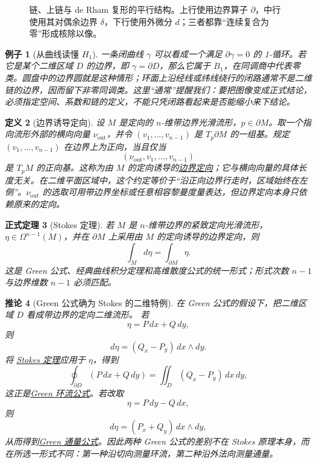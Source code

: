 \documentclass[UTF8,fontset=none,a4paper,11pt]{ctexart}
\theoremstyle{foundation-definition}
\newtheorem{definition}{定义}[section]
\theoremstyle{foundation-theorem}
\newtheorem{theorem}[definition]{正式定理}
\theoremstyle{foundation-proposition}
\theoremstyle{foundation-example}
\newtheorem{example}[definition]{例子}
\theoremstyle{foundation-remark}
\theoremstyle{foundation-theorem}
\newtheorem{corollary}[definition]{推论}
\newcommand{\term}[2]{\hyperref[#1]{#2}}
\begin{document}
\begin{figure}[htbp]
\caption{链、上链与 de Rham 复形的平行结构。上行使用边界算子 \(\partial\)，中行使用其对偶余边界 \(\delta\)，下行使用外微分 \(d\)；三者都靠“连续复合为零”形成核除以像。}
\label{fig:chain-cochain-derham-parallel}
\end{figure}

\begin{example}[从曲线读懂 \(H_1\)]
一条闭曲线 \(\gamma\) 可以看成一个满足 \(\partial\gamma=0\) 的 1-循环。若它是某个二维区域 \(D\) 的边界，即 \(\gamma=\partial D\)，那么它属于 \(B_1\)，在同调商中代表零类。圆盘中的边界圆就是这种情形；环面上沿经线或纬线绕行的闭路通常不是二维链的边界，因而留下非零同调类。这里“通常”提醒我们：要把图像变成正式结论，必须指定空间、系数和链的定义，不能只凭闭路看起来是否能缩小来下结论。
\end{example}

\begin{definition}[边界诱导定向]\label{def:boundary-orientation}
设 \(M\) 是定向的 \(n\)-维带边界光滑流形，\(p\in\partial M\)。取一个指向流形外部的横向向量 \(\nu_{\mathrm{out}}\)，并令
\((v_1,\ldots,v_{n-1})\) 是 \(T_p\partial M\) 的一组基。规定 \((v_1,\ldots,v_{n-1})\) 在边界上为正向，当且仅当
\[
(\nu_{\mathrm{out}},v_1,\ldots,v_{n-1})
\]
是 \(T_pM\) 的正向基。这称为由 \(M\) 的定向诱导的\term{def:boundary-orientation}{边界定向}；它与横向向量的具体长度无关。在二维平面区域中，这个约定等价于“沿正向边界行走时，区域始终在左侧”。\(\nu_{\mathrm{out}}\) 的选取可用带边界坐标或任意相容黎曼度量表达，但边界定向本身只依赖原来的定向。
\end{definition}

\begin{theorem}[Stokes 定理]\label{thm:stokes}
若 \(M\) 是 \(n\)-维带边界的紧致定向光滑流形，\(\eta\in\Omega^{n-1}(M)\)，并在 \(\partial M\) 上采用由 \(M\) 的定向诱导的边界定向，则
\[
\int_Md\eta=\int_{\partial M}\eta.
\]
这是 Green 公式、经典曲线积分定理和高维散度公式的统一形式；形式次数 \(n-1\) 与边界维数 \(n-1\) 必须匹配。
\end{theorem}

\begin{corollary}[Green 公式确为 Stokes 的二维特例]\label{cor:green-as-stokes}
在 Green 公式的假设下，把二维区域 \(D\) 看成带边界的定向二维流形。
若
\[
\eta=P\,dx+Q\,dy,
\]
则
\[
d\eta=(Q_x-P_y)\,dx\wedge dy.
\]
将 \term{thm:stokes}{Stokes 定理}应用于 \(\eta\)，得到
\[
\oint_{\partial D}(P\,dx+Q\,dy)
=\iint_D(Q_x-P_y)\,dx\,dy,
\]
这正是\term{thm:green-circulation}{Green 环流公式}。若改取
\[
\eta=P\,dy-Q\,dx,
\]
则
\[
d\eta=(P_x+Q_y)\,dx\wedge dy,
\]
从而得到\term{thm:green-flux}{Green 通量公式}。因此两种 Green 公式的差别不在
Stokes 原理本身，而在所选一形式不同：第一种沿切向测量环流，第二种沿外法向测量通量。
\end{corollary}
\end{document}
